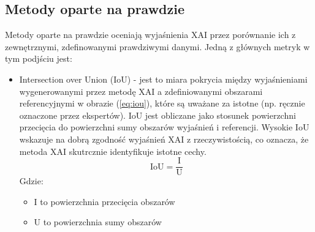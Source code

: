 \subsection*{Metody oparte na prawdzie}
Metody oparte na prawdzie oceniają wyjaśnienia XAI przez porównanie ich z zewnętrznymi, zdefinowanymi prawdziwymi danymi. Jedną z głównych metryk w tym podjściu jest:
\begin{itemize}
	\item Intersection over Union (IoU) - jest to miara pokrycia między wyjaśnieniami wygenerowanymi przez metodę XAI a zdefiniowanymi obszarami referencyjnymi w obrazie (\ref{eq:iou}), które są uważane za istotne (np. ręcznie oznaczone przez ekspertów).
	      IoU jest obliczane jako stosunek powierzchni przecięcia do powierzchni sumy obszarów wyjaśnień i referencji. Wysokie IoU wskazuje na dobrą zgodność wyjaśnień XAI z rzeczywistością, co oznacza, że metoda XAI skutrcznie identyfikuje istotne cechy.
	      \begin{equation}
		      \text{IoU} = \frac{\text{I}}{\text{U}}
		      \label{eq:iou}
	      \end{equation}
	      Gdzie:
	      \begin{itemize}
		      \item I to powierzchnia przecięcia obszarów
		      \item U to powierzchnia sumy obszarów
	      \end{itemize}
\end{itemize}
